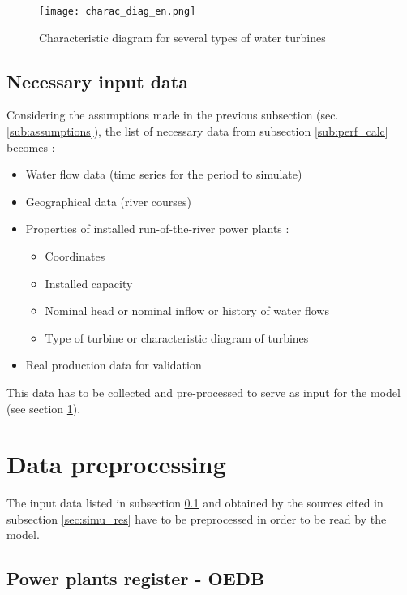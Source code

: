 \begin{figure}[H]
\centering
\texttt{[image: charac\_diag\_en.png]}
\caption[Characteristic diagram for several types of water turbines]{Characteristic diagram for several types of water turbines \cite{wiki_WK}}
\label{charac_diag}
\end{figure}

\subsection{Necessary input data}
\label{sub:collec_data}

Considering the assumptions made in the previous subsection (sec. \ref{sub:assumptions}), the list of necessary data from subsection \ref{sub:perf_calc} becomes :
\begin{itemize}
 \item Water flow data (time series for the period to simulate)
 \item Geographical data (river courses)
 \item Properties of installed run-of-the-river power plants :
 \begin{itemize}
  \item Coordinates
  \item Installed capacity
  \item Nominal head or nominal inflow or history of water flows
  \item Type of turbine or characteristic diagram of turbines
 \end{itemize}
 \item Real production data for validation
\end{itemize}

This data has to be collected and pre-processed to serve as input for the model (see section \ref{sec:data_preproc}).

\section{Data preprocessing}
\label{sec:data_preproc}
The input data listed in subsection \ref{sub:collec_data} and obtained by the sources cited in subsection \ref{sec:simu_res} have to be preprocessed in order to be read by the model.

\subsection{Power plants register - OEDB}
\label{sub:pp_reg}

